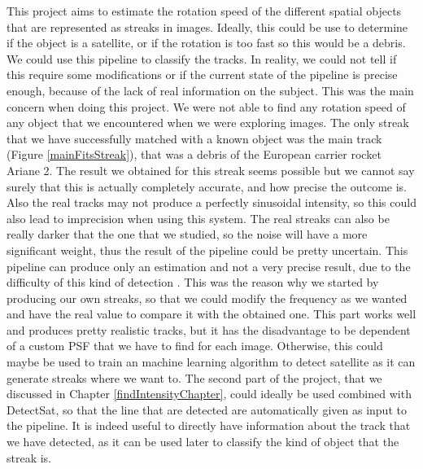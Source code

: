 \documentclass[a4paper,12pt,oneside]{report}
\begin{document}
This project aims to estimate the rotation speed of the different spatial objects that are represented as streaks in images. Ideally,
this could be use to determine if the object is a satellite, or if the rotation is too fast so this would be a debris. We could use 
this pipeline to classify the tracks.
\newline
\newline
In reality, we could not tell if this require some modifications or if the current state of the pipeline is precise enough, because of 
the lack of real information on the subject. This was the main concern when doing this project. We were not able to find any rotation speed of any object that we encountered when we were
exploring images. The only streak that we have successfully matched with a known object was the main track (Figure \ref{mainFitsStreak}),
that was a debris of the European carrier rocket Ariane 2. The result we obtained for this streak seems possible but we cannot say surely
that this is actually completely accurate, and how precise the outcome is. Also the real tracks may not produce a perfectly sinusoidal intensity, so this could also lead
to imprecision when using this system. The real streaks can also be really darker that the one that we studied, so the noise will have a more 
significant weight, thus the result of the pipeline could be pretty uncertain. This pipeline can produce only an estimation and not a very
precise result, due to the difficulty of this kind of detection \cite{GeoSatellite}.
\newline
\newline
This was the reason why we started by producing our own streaks, so that we could modify the frequency as we wanted and have the real
value to compare it with the obtained one. This part works well and produces pretty realistic tracks, but it has the disadvantage to be
dependent of a custom PSF that we have to find for each image. Otherwise, this could maybe be used to train an machine learning algorithm
to detect satellite as it can generate streaks where we want to. 
\newline
\newline
The second part of the project, that we discussed in Chapter \ref{findIntensityChapter}, could ideally be used combined with DetectSat,
so that the line that are detected are automatically given as input to the pipeline. It is indeed useful to directly have information
about the track that we have detected, as it can be used later to classify the kind of object that the streak is. 
\end{document}
